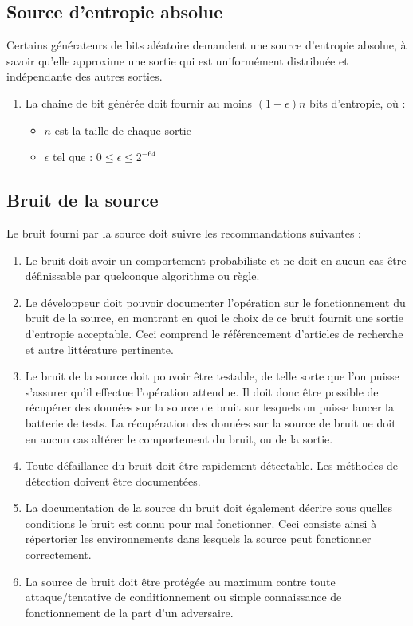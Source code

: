 \subsection{Source d'entropie absolue}
Certains générateurs de bits aléatoire demandent une source d'entropie absolue, à savoir qu'elle approxime une sortie qui est uniformément distribuée et indépendante des autres sorties. 
\begin{enumerate}
\item La chaine de bit générée doit fournir au moins $(1-\epsilon)n$ bits d'entropie, où : 
	\begin{itemize}
	\item $n$ est la taille de chaque sortie
	\item $\epsilon$ tel que : $0\leqslant \epsilon \leqslant 2^{-64}$
	\end{itemize}
\end{enumerate}

\subsection{Bruit de la source}
Le bruit fourni par la source doit suivre les recommandations suivantes :
\begin{enumerate}
\item Le bruit doit avoir un comportement probabiliste et ne doit en aucun cas être définissable par quelconque algorithme ou règle.
\item Le développeur doit pouvoir documenter l'opération sur le fonctionnement du bruit de la source, en montrant en quoi le choix de ce bruit fournit une sortie d'entropie acceptable. Ceci comprend le référencement d'articles de recherche et autre littérature pertinente.
\item Le bruit de la source doit pouvoir être testable, de telle sorte que l'on puisse s'assurer qu'il effectue l'opération attendue. Il doit donc être possible de récupérer des données sur la source de bruit sur lesquels on puisse lancer la batterie de tests. La récupération des données sur la source de bruit ne doit en aucun cas altérer le comportement du bruit, ou de la sortie.
\item Toute défaillance du bruit doit être rapidement détectable. Les méthodes de détection doivent être documentées.
\item La documentation de la source du bruit doit également décrire sous quelles conditions le bruit est connu pour mal fonctionner. Ceci consiste ainsi à répertorier les environnements dans lesquels la source peut fonctionner correctement. 
\item La source de bruit doit être protégée au maximum contre toute attaque/tentative de conditionnement ou simple connaissance de fonctionnement de la part d'un adversaire. 
\end{enumerate}

